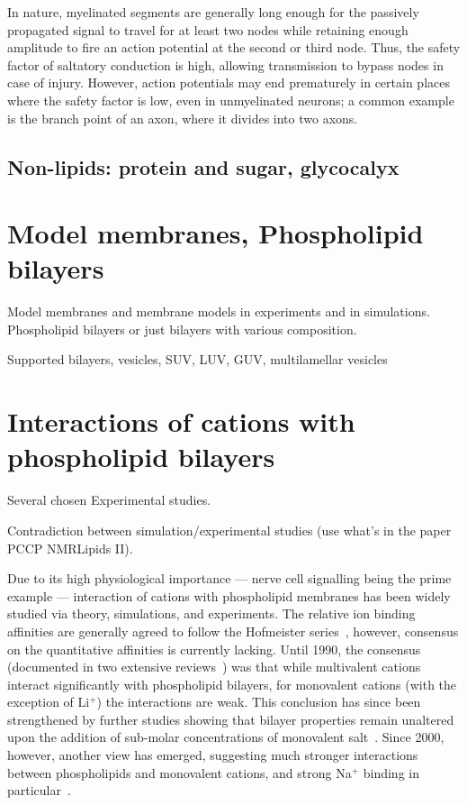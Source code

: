 In nature, myelinated segments are generally long enough for the passively propagated signal to travel for at least two nodes while retaining enough amplitude to fire an action potential at the second or third node. Thus, the safety factor of saltatory conduction is high, allowing transmission to bypass nodes in case of injury. However, action potentials may end prematurely in certain places where the safety factor is low, even in unmyelinated neurons; a common example is the branch point of an axon, where it divides into two axons.

\subsection{Non-lipids: protein and sugar, glycocalyx}

\section{Model membranes, Phospholipid bilayers }
\label{sec:modelmemb}

 Model membranes and membrane models in experiments and in simulations.
 Phospholipid bilayers or just bilayers with various composition. 

 Supported bilayers, vesicles, SUV, LUV, GUV, multilamellar vesicles




\section{Interactions of cations with phospholipid bilayers}

 Several chosen Experimental studies. 

 Contradiction between simulation/experimental studies 
 (use what's in the paper PCCP NMRLipids II). 


Due to its high physiological importance --- nerve cell signalling being the prime example ---
interaction of cations with phospholipid membranes
has been widely studied via theory, simulations, and experiments.
The relative ion binding affinities are generally agreed to
follow the Hofmeister series~\cite{eisenberg79,cevc90,tocanne90,binder02,celma07,leontidis09,vacha09a,klasczyk10,harb13}, 
however,
consensus on the quantitative affinities is currently lacking.
Until 1990, the consensus (documented in two extensive reviews~\cite{cevc90,tocanne90}) was that
while  multivalent cations interact significantly with phospholipid bilayers,
for monovalent cations (with the exception of Li$^+$) the interactions are weak.
This conclusion has since been strengthened by further
studies showing that bilayer properties remain unaltered upon the addition of sub-molar concentrations of monovalent 
salt~\cite{binder02,pabst07,filippov09}.
Since 2000, however, another view has emerged, suggesting much stronger interactions between phospholipids and monovalent cations, and strong Na$^{+}$ binding in particular~\cite{bockmann03,bockmann04,vacha09a,manyes05,manyes06,fukuma07,leontidis09,ferber11,morata12,klasczyk10,harb13}.


